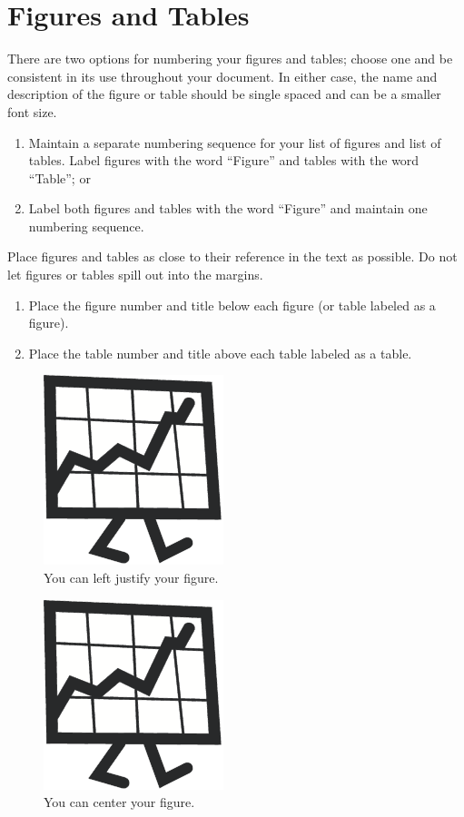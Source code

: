 \section{Figures and Tables}

There are two options for numbering your figures and tables; choose one and be consistent in its use throughout your document.
In either case, the name and description of the figure or table should be single spaced and can be a smaller font size.

\begin{enumerate}
	\item Maintain a separate numbering sequence for your list of figures and list of tables.
Label figures with the word ``Figure'' and tables with the word ``Table''; or
	\item Label both figures and tables with the word ``Figure'' and maintain one numbering sequence.
\end{enumerate}

Place figures and tables as close to their reference in the text as possible.
Do not let figures or tables spill out into the margins.

\begin{enumerate}
	\item Place the figure number and title below each figure (or table labeled as a figure).
	\item Place the table number and title above each table labeled as a table.
\end{enumerate}

\begin{figure}
    \includegraphics{figures/just-a-figure}
    \captionstyle{\raggedright}
    \caption[Left justified figure]{You can left justify your figure.}
    \label{fig:left-justified}
\end{figure}

\begin{figure}
    \centering
    \includegraphics{figures/just-a-figure}
    \caption[Centered figure]{You can center your figure.}
    \label{fig:centered}
\end{figure}


